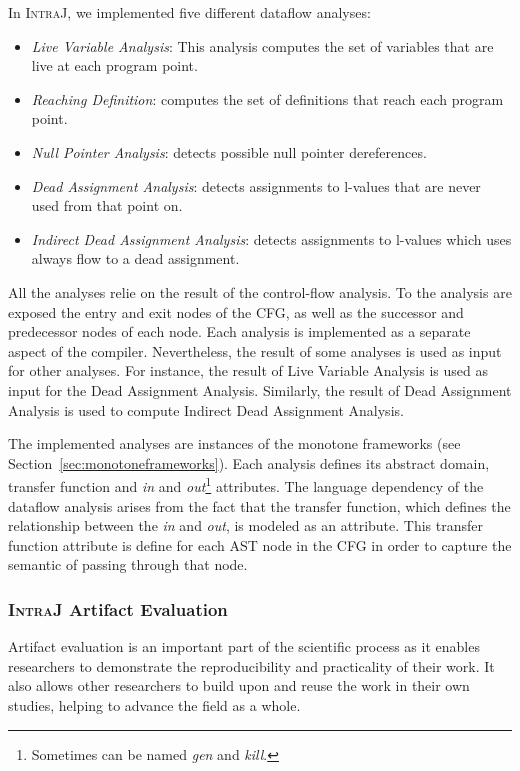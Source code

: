In \textsc{IntraJ}, we implemented five different dataflow analyses:
\begin{itemize}
  \item \emph{Live Variable Analysis}: This analysis computes the set of variables that are live at each program point.
  \item \emph{Reaching Definition}: computes the set of definitions that reach each program point.
  \item \emph{Null Pointer Analysis}: detects possible null pointer dereferences.
  \item \emph{Dead Assignment Analysis}: detects assignments to l-values that are never used from that point on.
  \item \emph{Indirect Dead Assignment Analysis}: detects assignments to l-values which uses always flow to a dead assignment.
\end{itemize}
All the analyses relie on the result of the control-flow analysis. To the analysis are exposed
the entry and exit nodes of the CFG, as well as the successor and predecessor
nodes of each node.
Each analysis is implemented as a separate aspect of the compiler. Nevertheless,
the result of some analyses is used as input for other analyses. For instance,
the result of Live Variable Analysis is used as input for the Dead Assignment Analysis.
Similarly, the result of Dead Assignment Analysis is used to compute Indirect Dead Assignment Analysis.

The implemented analyses are instances of the monotone frameworks (see Section~\ref{sec:monotoneframeworks}).
Each analysis defines its abstract domain, transfer function and \emph{in} and
\emph{out}\footnote{Sometimes can be named \emph{gen} and \emph{kill}.} attributes.
The language dependency of the dataflow analysis arises from the fact that the
transfer function, which defines the relationship between the \emph{in} and \emph{out},
is modeled as an attribute. This transfer function attribute is
define for each AST node in the CFG in order to capture the semantic of passing
through that node.


\subsubsection{\textsc{IntraJ} Artifact Evaluation}
Artifact evaluation is an important part of the scientific process as it enables 
researchers to demonstrate the reproducibility and practicality of their work. 
It also allows other researchers to build upon and reuse the work in their own 
studies, helping to advance the field as a whole.

